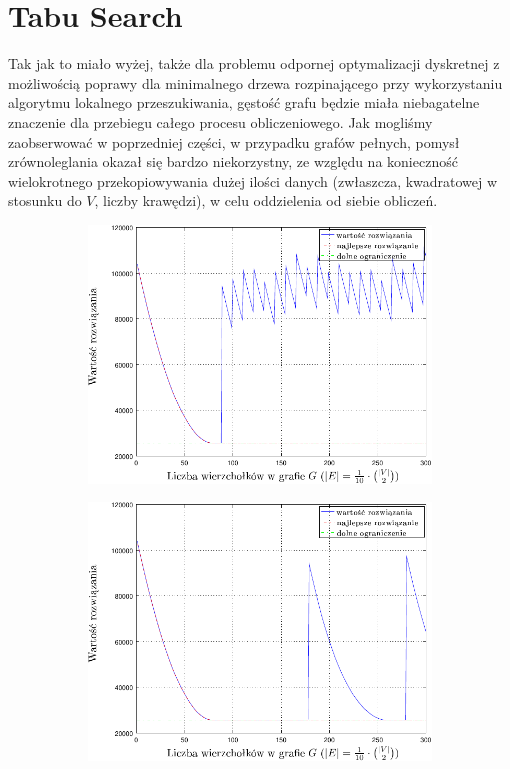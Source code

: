 \section{Tabu Search}

Tak jak to miało wyżej, także dla problemu odpornej optymalizacji dyskretnej z możliwością poprawy dla minimalnego drzewa rozpinającego przy wykorzystaniu algorytmu lokalnego przeszukiwania, gęstość grafu będzie miała niebagatelne znaczenie dla przebiegu całego procesu obliczeniowego. Jak mogliśmy zaobserwować w poprzedniej części, w przypadku grafów pełnych, pomysł zrównoleglania okazał się bardzo niekorzystny, ze względu na konieczność wielokrotnego przekopiowywania dużej ilości danych (zwłaszcza, kwadratowej w stosunku do $V$, liczby krawędzi), w celu oddzielenia od siebie obliczeń.

\begin{figure}[!htbp]
	\null\hfill
	\begin{subfigure}[b]{0.45\textwidth}
		\includegraphics[width=\textwidth]{Chapter_VI/RRIMST1-example/RRIMST1_psfrag}
		\caption{}
		\label{fig:rrimst1:a}
	\end{subfigure}
	\hfill
	\begin{subfigure}[b]{0.45\textwidth}
		\includegraphics[width=\textwidth]{Chapter_VI/RRIMST2-example/RRIMST2_psfrag}

\end{subfigure}
\end{figure}
